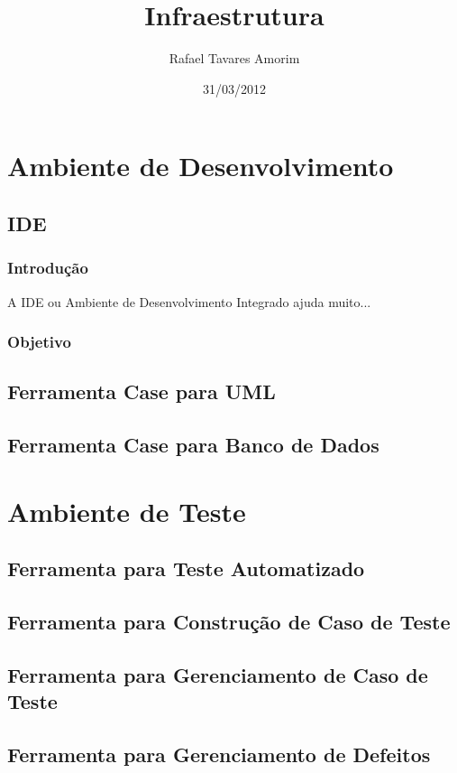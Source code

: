 \documentclass[12pt,a4paper]{article}
\begin{document}
\title{Infraestrutura}
\author{Rafael Tavares Amorim}
\date{31/03/2012}
\maketitle
\thispagestyle{empty}
\newpage
\tableofcontents
\thispagestyle{empty}
\newpage
\section{Ambiente de Desenvolvimento}
	\subsection{IDE}
		\subsubsection{Introdução}

				A IDE ou Ambiente de Desenvolvimento Integrado ajuda muito...

		\subsubsection{Objetivo}


	\subsection{Ferramenta Case para UML}
	\subsection{Ferramenta Case para Banco de Dados}

\section{Ambiente de Teste}
	\subsection{Ferramenta para Teste Automatizado}
	\subsection{Ferramenta para Construção de Caso de Teste}
	\subsection{Ferramenta para Gerenciamento de Caso de Teste}
	\subsection{Ferramenta para Gerenciamento de Defeitos}
\end{document}
